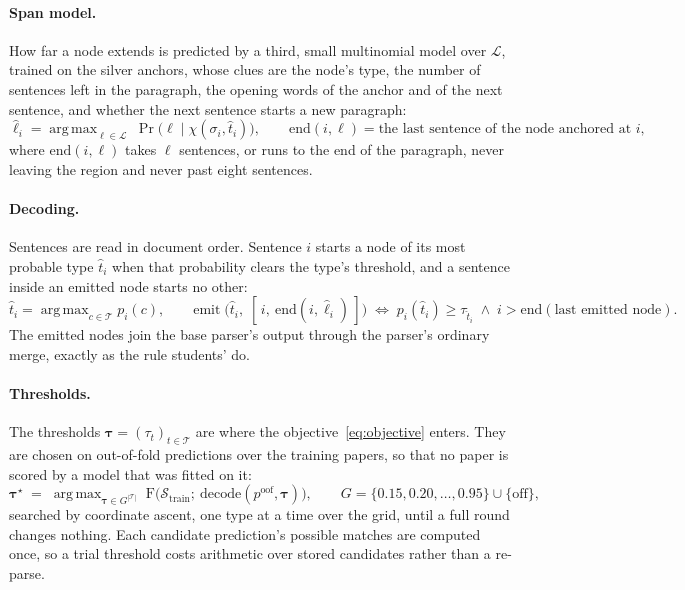 \documentclass[10pt]{article}
\DeclareMathOperator*{\argmax}{arg\,max}
\begin{document}
\paragraph{Span model.}
How far a node extends is predicted by a third, small multinomial model over $\mathcal{L}$, trained on the silver anchors, whose clues are the node's type, the number of sentences left in the paragraph, the opening words of the anchor and of the next sentence, and whether the next sentence starts a new paragraph:
%
\begin{equation}
  \hat\ell_i = \argmax_{\ell\in\mathcal{L}}\;\Pr\bigl(\ell \mid \chi(\sigma_i,\hat t_i)\bigr),
  \qquad
  \mathrm{end}(i,\ell) = \text{the last sentence of the node anchored at } i,
\end{equation}
%
where $\mathrm{end}(i,\ell)$ takes $\ell$ sentences, or runs to the end of the paragraph, never leaving the region and never past eight sentences.

\paragraph{Decoding.}
Sentences are read in document order. Sentence $i$ starts a node of its most probable type $\hat t_i$ when that probability clears the type's threshold, and a sentence inside an emitted node starts no other:
%
\begin{equation}
  \hat t_i=\argmax_{c\in\mathcal{T}} p_i(c),
  \qquad
  \text{emit}\;\bigl(\hat t_i,\;[\,i,\ \mathrm{end}(i,\hat\ell_i)\,]\bigr)
  \;\iff\;
  p_i(\hat t_i)\ge\tau_{\hat t_i}
  \;\wedge\;
  i>\mathrm{end}(\text{last emitted node}).
  \label{eq:decode}
\end{equation}
%
The emitted nodes join the base parser's output through the parser's ordinary merge, exactly as the rule students' do.

\paragraph{Thresholds.}
The thresholds $\boldsymbol{\tau}=(\tau_t)_{t\in\mathcal{T}}$ are where the objective~\eqref{eq:objective} enters. They are chosen on out-of-fold predictions over the training papers, so that no paper is scored by a model that was fitted on it:
%
\begin{equation}
  \boldsymbol{\tau}^\star
  \;=\;
  \argmax_{\boldsymbol{\tau}\in G^{|\mathcal{T}|}}\;
  \mathrm{F}\bigl(\mathcal{S}_{\mathrm{train}};\ \text{decode}(p^{\mathrm{oof}},\boldsymbol{\tau})\bigr),
  \qquad
  G=\{0.15,0.20,\dots,0.95\}\cup\{\mathrm{off}\},
  \label{eq:tau}
\end{equation}
%
searched by coordinate ascent, one type at a time over the grid, until a full round changes nothing. Each candidate prediction's possible matches are computed once, so a trial threshold costs arithmetic over stored candidates rather than a re-parse.
\end{document}
